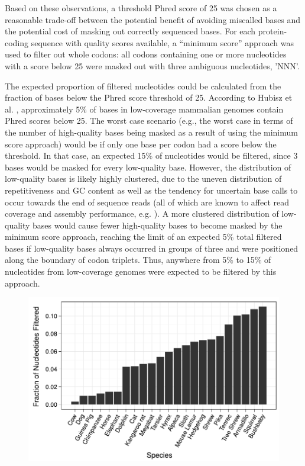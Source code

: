 Based on these observations, a threshold Phred score of 25 was chosen
as a reasonable trade-off between the potential benefit of avoiding
miscalled bases and the potential cost of masking out correctly
sequenced bases. For each protein-coding sequence with quality scores
available, a ``minimum score'' approach was used to filter out whole
codons: all codons containing one or more nucleotides with a score
below 25 were masked out with three ambiguous nucleotides, 'NNN'.

The expected proportion of filtered nucleotides could be calculated
from the fraction of bases below the Phred score threshold of
25. According to Hubisz et al. \citeyearpar{Hubisz2011}, approximately
5\% of bases in low-coverage mammalian genomes contain Phred scores
below 25. The worst case scenario (e.g., the worst case in terms of
the number of high-quality bases being masked as a result of using the
minimum score approach) would be if only one base per codon had a
score below the threshold. In that case, an expected 15\% of
nucleotides would be filtered, since 3 bases would be masked for every
low-quality base. However, the distribution of low-quality bases is
likely highly clustered, due to the uneven distribution of
repetitiveness and GC content as well as the tendency for uncertain
base calls to occur towards the end of sequence reads (all of which
are known to affect read coverage and assembly performance,
e.g. \cite{Teytelman2009}). A more clustered distribution of
low-quality bases would cause fewer high-quality bases to become
masked by the minimum score approach, reaching the limit of an
expected 5\% total filtered bases if low-quality bases always occurred
in groups of three and were positioned along the boundary of codon
triplets. Thus, anywhere from 5\% to 15\% of nucleotides from
low-coverage genomes were expected to be filtered by this approach.

\begin{figure}
\centering
\includegraphics[scale=0.9]{Figs/qual_filter_hist.pdf}
\caption{}
\label{filtered_qual_bars}
\end{figure}


